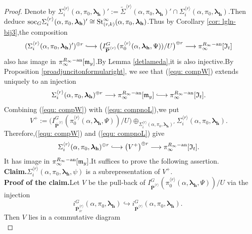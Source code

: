 \documentclass[SecEq,CM,GP]{degruyter-crelle} %
\theoremstyle{plain}
\newcommand{\hooklongrightarrow}{\lhook\joinrel\longrightarrow}
\newcommand{\ana}{{\rm an}}
\newcommand{\lrr}{{\langle r\rangle}}
\newcommand{\lra}{\longrightarrow}
\newcommand{\op}{{\overline{{\mathbf{P}}}}}
\newcommand{\st}{{\rm St}}
\newcommand{\soc}{{\rm soc}}
\newcommand{\bh}{{\mathbf{h}}}
\newcommand{\FI}{{\mathfrak{I}}}
\newcommand{\fm}{{\mathfrak{m}}}
\begin{document}
\begin{proof}
Denote by $\Sigma_i^{\lrr}(\alpha,\pi_0, {\bm\lambda}_\bh)':=\widetilde{\Sigma}^{\lrr}(\alpha,\pi_0, {\bm\lambda}_\bh)' \cap \Sigma_i^{\lrr}(\alpha,\pi_0, {\bm\lambda}_\bh)$.\;Then \cite[Proposition 5.28]{2022ext1hyq} deduce $\soc_{G} \Sigma_i^{\lrr}(\alpha,\pi_0, {\bm\lambda}_\bh)'\cong \st_{(r,k)}^{\infty}(\alpha,\pi_0, {\bm\lambda}_\bh)$.\;Thus by Corollary \ref{cor: lgln-bij3},\;the  composition
\begin{equation}\label{equ: compW}
	(\Sigma_i^{\lrr}(\alpha,\pi_0, {\bm\lambda}_\bh)')^{\oplus r} \hooklongrightarrow \big(I_{\op^{\lrr}}^G (\pi_0^{\lrr}(\alpha,{\bm\lambda}_\bh,\Psi))/U\big)^{\oplus r} \lra \pi_{\infty}^{R_{\infty}-\ana}[\FI_t]
\end{equation}
also has image in $\pi_{\infty}^{R_{\infty}-\ana}[\fm_y]$.\;By Lemma \ref{detlameda},\;it is also injective.\;By Proposition \ref{proadjuncitonformularight}, we see that (\ref{equ: compW}) extends uniquely to   an injection
\begin{equation}\label{equ: compnoL}\Sigma_i^{\lrr}(\alpha,\pi_0, {\bm\lambda}_\bh)^{\oplus r} \lra \pi_{\infty}^{R_{\infty}-\ana}[\fm_y] \hooklongrightarrow \pi_{\infty}^{R_{\infty}-\ana}[\FI_t].\end{equation}
Combining (\ref{equ: compW}) with  (\ref{equ: compnoL}),\;we put $$V^+:=\big(I_{\op^{\lrr}}^G (\pi_0^{\lrr}(\alpha,{\bm\lambda}_\bh,\Psi))/U\big)\oplus_{\Sigma_i^{\lrr}(\alpha,\pi_0, {\bm\lambda}_\bh)'} \Sigma_i^{\lrr}(\alpha,\pi_0, {\bm\lambda}_\bh).$$
Therefore,\;(\ref{equ: compW}) and  (\ref{equ: compnoL}) give
\begin{equation}\label{equ: lgL1}
	\begin{aligned}
		\Sigma_i^{\lrr}(\alpha,\pi_0, {\bm\lambda}_\bh)^{\oplus r}\hooklongrightarrow \big(V^+\big)^{\oplus r}\lra \pi_{\infty}^{R_{\infty}-\ana}[\FI_t].
	\end{aligned}
\end{equation}
It has image in $\pi_{\infty}^{R_{\infty}-\ana}[\fm_y]$.\;It suffices to prove the following assertion.\;\\
\textbf{Claim.\;}$\Sigma_i^{\lrr}(\alpha,\pi_0, {\bm\lambda}_\bh, \psi)$ is a subrepresentation of $V^+$.\;\\
\textbf{Proof of the claim.\;}Let $V$ be the pull-back of $I_{\op^{\lrr}}^G (\pi_0^{\lrr}(\alpha,{\bm\lambda}_\bh,\Psi))/U$ via the injection \[i_{\op^{\lrr}_{ir}}^G(\alpha,\pi_0, {\bm\lambda}_\bh) \hookrightarrow i_{\op^{\lrr}}^G(\alpha,\pi_0, {\bm\lambda}_\bh).\;\]Then $V$ lies in a commutative diagram
\begin{equation}\label{commrevi}

\end{equation}
\end{proof}
\end{document}

